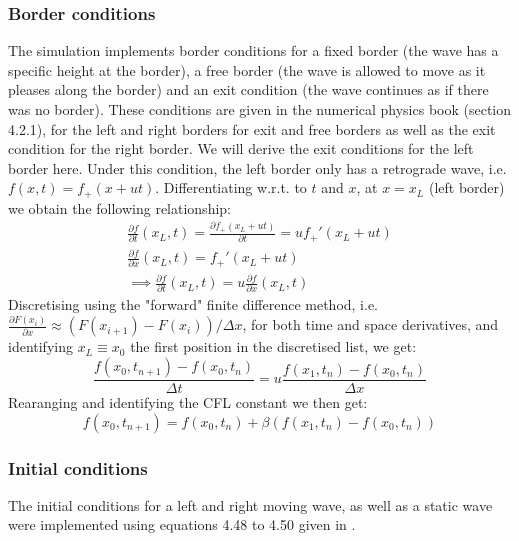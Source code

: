 \subsubsection{Border conditions}

The simulation implements border conditions for a fixed border (the wave has a specific height at the border), a free border (the wave is allowed to move as it pleases along the border) and an exit condition (the wave continues as if there was no border). These conditions are given in the numerical physics book \cite{physnumbook} (section 4.2.1), for the left and right borders for exit and free borders as well as the exit condition for the right border. We will derive the exit conditions for the left border here. Under this condition, the left border only has a retrograde wave, i.e. \(f(x, t) = f_+(x + u t)\). Differentiating w.r.t. to \(t\) and \(x\), at \(x = x_L\) (left border) we obtain the following relationship:
\begin{gather}
    \frac{\partial f}{\partial t}(x_L, t) = \frac{\partial f_+(x_L + u t)}{\partial t} = u f_+'(x_L + u t) \\
    \frac{\partial f}{\partial x}(x_L, t) = f_+'(x_L + u t) \\
    \implies \frac{\partial f}{\partial t}(x_L, t) = u \frac{\partial f}{\partial x}(x_L, t)
\end{gather}
Discretising using the "forward" finite difference method, i.e. \(\frac{\partial F(x_i)}{\partial x} \approx (F(x_{i+1}) - F(x_i))/\Delta x\), for both time and space derivatives, and identifying \(x_L \equiv x_0\) the first position in the discretised list, we get:
\begin{equation}
    \frac{f(x_0,t_{n+1}) - f(x_0, t_n)}{\Delta t} = u \frac{f(x_1, t_n) - f(x_0, t_n)}{\Delta x}
\end{equation}
Rearanging and identifying the CFL constant we then get:
\begin{equation}
    f(x_0, t_{n+1}) = f(x_0, t_n) + \beta \left( f(x_1, t_n) - f(x_0, t_n) \right)
\end{equation}

\subsubsection{Initial conditions}

The initial conditions for a left and right moving wave, as well as a static wave were implemented using equations 4.48 to 4.50 given in \cite{physnumbook}.

